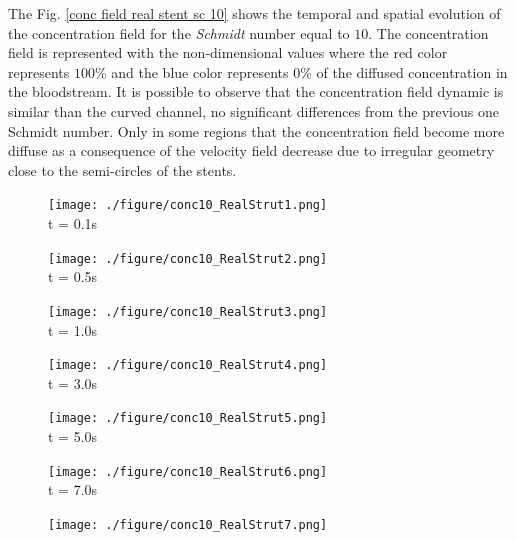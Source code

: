 \documentclass[10pt,fleqn,a4paper,twoside]{article}
\begin{document}
\smallskip
The Fig. \ref{conc field real stent sc 10}  shows the temporal and spatial evolution 
of the concentration field for the \textit{Schmidt} number equal to $10$. 
The concentration field is 
represented with the non-dimensional values where the red color 
represents $100$\% and the blue color represents $0$\% 
of the diffused concentration in the bloodstream. 
It is possible to observe that the concentration field dynamic
is similar than the curved channel, no significant differences
from the previous one Schmidt number.
Only in some regions that the concentration field
become more diffuse as a consequence of the velocity 
field decrease due to irregular geometry close to the
semi-circles of the stents.


\begin{figure}[H]
     \begin{minipage}{.50\linewidth}
      \centering
      \texttt{[image: ./figure/conc10\_RealStrut1.png]}\\
      t = 0.1s
     \end{minipage}%
     \begin{minipage}{.50\linewidth}
      \centering
      \texttt{[image: ./figure/conc10\_RealStrut2.png]}\\
      t = 0.5s
     \end{minipage}
     \begin{minipage}{.50\linewidth}
     \medskip
      \centering
      \texttt{[image: ./figure/conc10\_RealStrut3.png]}\\
      t = 1.0s
     \end{minipage}%
     \begin{minipage}{.50\linewidth}
     \medskip
      \centering
      \texttt{[image: ./figure/conc10\_RealStrut4.png]}\\
      t = 3.0s
     \end{minipage}
     \begin{minipage}{.50\linewidth}
      \centering
      \texttt{[image: ./figure/conc10\_RealStrut5.png]}\\
      t = 5.0s
     \end{minipage}%
     \begin{minipage}{.50\linewidth}
      \centering
      \texttt{[image: ./figure/conc10\_RealStrut6.png]}\\
      t = 7.0s
     \end{minipage}
     \begin{minipage}{.50\linewidth}
     \medskip
      \centering
      \texttt{[image: ./figure/conc10\_RealStrut7.png]}\\

\end{minipage}
\end{figure}
\end{document}
